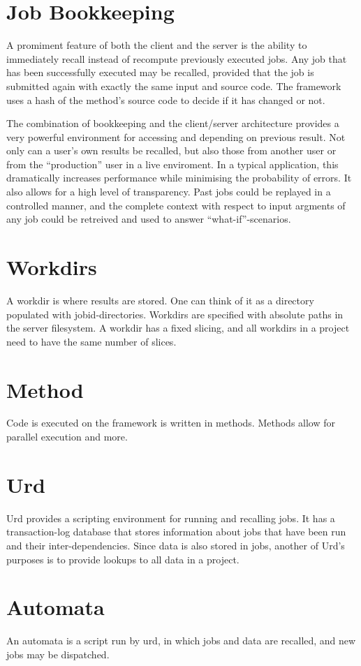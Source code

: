 \section{Job Bookkeeping}

A promiment feature of both the client and the server is the ability
to immediately recall instead of recompute previously executed jobs.
Any job that has been successfully executed may be recalled, provided
that the job is submitted again with exactly the same input and source
code.  The framework uses a hash of the method's source code to decide
if it has changed or not.

The combination of bookkeeping and the client/server architecture
provides a very powerful environment for accessing and depending on
previous result.  Not only can a user's own results be recalled, but
also those from another user or from the ``production'' user in a live
enviroment.  In a typical application, this dramatically increases
performance while minimising the probability of errors.  It also
allows for a high level of transparency.  Past jobs could be replayed
in a controlled manner, and the complete context with respect to input
argments of any job could be retreived and used to answer
``what-if''-scenarios.




\section{Workdirs}

A workdir is where results are stored.  One can think of it as a
directory populated with jobid-directories.  Workdirs are specified
with absolute paths in the server filesystem.  A workdir has a fixed
slicing, and all workdirs in a project need to have the same number of
slices.


\section{Method}

Code is executed on the framework is written in methods.  Methods
allow for parallel execution and more.



\section{Urd}

Urd provides a scripting environment for running and recalling jobs.
It has a transaction-log database that stores information about jobs
that have been run and their inter-dependencies.  Since data is also
stored in jobs, another of Urd's purposes is to provide lookups to all
data in a project.



\section{Automata}

An automata is a script run by urd, in which jobs and data are
recalled, and new jobs may be dispatched.